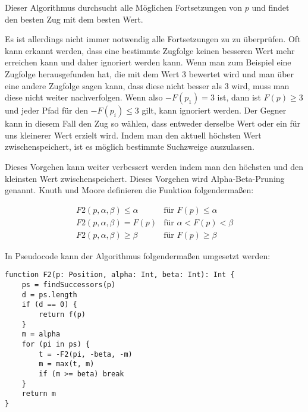 Dieser Algorithmus durchsucht alle Möglichen Fortsetzungen von $p$ und findet den besten Zug mit dem besten Wert. 
\cite{knuth_analysis_1975}

Es ist allerdings nicht immer notwendig alle Fortsetzungen zu zu überprüfen. Oft kann erkannt werden, dass eine bestimmte Zugfolge keinen besseren Wert mehr erreichen kann und daher ignoriert werden kann.
Wenn man zum Beispiel eine Zugfolge herausgefunden hat, die mit dem Wert 3 bewertet wird und man über eine andere Zugfolge sagen kann, dass diese nicht besser als 3 wird, muss man diese nicht weiter nachverfolgen. Wenn also $-F(p_1) = 3$ ist, dann ist $F(p) \geq 3$ und jeder Pfad für den $-F(p_i) \leq 3$ gilt, kann ignoriert werden.
Der Gegner kann in diesem Fall den Zug so wählen, dass entweder derselbe Wert oder ein für uns kleinerer Wert erzielt wird. Indem man den aktuell höchsten Wert zwischenspeichert, ist es möglich bestimmte Suchzweige auszulassen.
\cite{knuth_analysis_1975}


Dieses Vorgehen kann weiter verbessert werden indem man den höchsten und den kleinsten Wert zwischenspeichert. Dieses Vorgehen wird Alpha-Beta-Pruning genannt. Knuth und Moore definieren die Funktion folgendermaßen:

\begin{equation}
    \begin{array}{ll}
        F2(p, \alpha, \beta) \leq \alpha & \text{für }F(p) \leq \alpha \\
        F2(p, \alpha, \beta) = F(p) & \text{für }\alpha < F(p) < \beta \\
        F2(p, \alpha, \beta) \geq \beta & \text{für }F(p) \geq \beta
    \end{array}
\end{equation}

In Pseudocode kann der Algorithmus folgendermaßen umgesetzt werden:
\begin{lstlisting}
function F2(p: Position, alpha: Int, beta: Int): Int {
    ps = findSuccessors(p)
    d = ps.length
    if (d == 0) {
        return f(p)
    }
    m = alpha
    for (pi in ps) {
        t = -F2(pi, -beta, -m)
        m = max(t, m)
        if (m >= beta) break
    }
    return m
}
\end{lstlisting}
\cite{knuth_analysis_1975}


